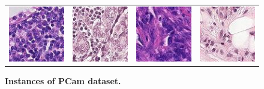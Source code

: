 \documentclass{article}
\begin{document}
\begin{figure}[h!]
	\centering
	\begin{tabular}{cccc}
 		\includegraphics[width=1.in]{img/pcam1.jpg} &
		\includegraphics[width=1.in]{img/pcam2.jpg} & 
            \includegraphics[width=1.in]{img/pcam3.jpg} &
             \includegraphics[width=1.in]{img/pcam4.jpg}
        \end{tabular}
	\caption{{\bf Instances of PCam dataset.}}
	\label{fig:pcam_example}
\end{figure} 
\end{document}
